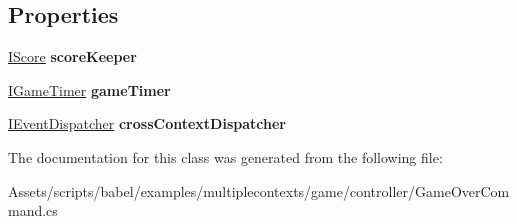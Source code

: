 \subsection*{Properties}
\begin{DoxyCompactItemize}
\item 
\hypertarget{classbabel_1_1examples_1_1multiplecontexts_1_1game_1_1_game_over_command_ac4ef3ae2a30e67724b254e5605d0b05d}{\hyperlink{interfacebabel_1_1examples_1_1multiplecontexts_1_1game_1_1_i_score}{I\-Score} {\bfseries score\-Keeper}}\label{classbabel_1_1examples_1_1multiplecontexts_1_1game_1_1_game_over_command_ac4ef3ae2a30e67724b254e5605d0b05d}

\item 
\hypertarget{classbabel_1_1examples_1_1multiplecontexts_1_1game_1_1_game_over_command_a75ae5f7138460cfd416411f0b3bab583}{\hyperlink{interfacebabel_1_1examples_1_1multiplecontexts_1_1game_1_1_i_game_timer}{I\-Game\-Timer} {\bfseries game\-Timer}}\label{classbabel_1_1examples_1_1multiplecontexts_1_1game_1_1_game_over_command_a75ae5f7138460cfd416411f0b3bab583}

\item 
\hypertarget{classbabel_1_1examples_1_1multiplecontexts_1_1game_1_1_game_over_command_a6bfa01211d8c9b18f038c1c661af380c}{\hyperlink{interfacebabel_1_1extensions_1_1dispatcher_1_1eventdispatcher_1_1api_1_1_i_event_dispatcher}{I\-Event\-Dispatcher} {\bfseries cross\-Context\-Dispatcher}}\label{classbabel_1_1examples_1_1multiplecontexts_1_1game_1_1_game_over_command_a6bfa01211d8c9b18f038c1c661af380c}

\end{DoxyCompactItemize}


The documentation for this class was generated from the following file\-:\begin{DoxyCompactItemize}
\item 
Assets/scripts/babel/examples/multiplecontexts/game/controller/Game\-Over\-Command.\-cs\end{DoxyCompactItemize}
